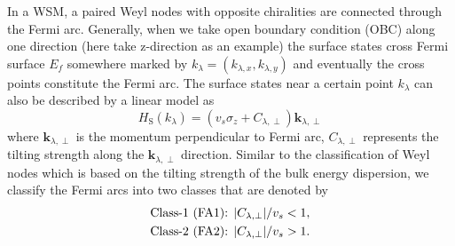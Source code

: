 \documentclass[twocolumn,superscriptaddress]{revtex4}%
\begin{document}
In a WSM, a paired Weyl nodes with opposite chiralities are connected through
the Fermi arc. Generally, when we take open boundary condition (OBC) along one
direction (here take z-direction as an example) the surface states cross Fermi
surface $E_{f}$ somewhere marked by $k_{\lambda}=(k_{\lambda,x},k_{\lambda
,y})$ and eventually the cross points constitute the Fermi arc. The surface
states near a certain point $k_{\lambda}$ can also be described by a linear
model as
\begin{equation}
H_{\mathrm{S}}(k_{\lambda})=(v_{s}\sigma_{z}+C_{\lambda,\perp})\mathbf{k}%
_{\lambda,\perp}%
\end{equation}
where $\mathbf{k}_{\lambda,\perp}$ is the momentum perpendicular to Fermi arc,
$C_{\lambda,\perp}$ represents the tilting strength along the $\mathbf{k}%
_{\lambda,\perp}$ direction. Similar to the classification of Weyl nodes which
is based on the tilting strength of the bulk energy dispersion, we classify
the Fermi arcs into two classes that are denoted by
\begin{align}
\mathrm{Class\text{-}1}\text{ }\mathrm{(FA1)}\text{{}}  &  \text{\textrm{: }%
}|C_{\lambda,{\perp}}|/v_{s}<1,\nonumber \\
\mathrm{Class\text{-}2}\text{ }\mathrm{(FA2)}\text{{}}  &  \text{\textrm{: }%
}|C_{\lambda,{\perp}}|/v_{s}>1.
\end{align}
\end{document}

